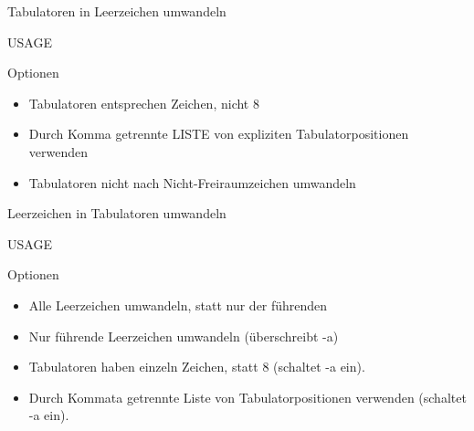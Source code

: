 \documentclass[aspectratio=43]{beamer}
\begin{document}
\begin{frame} 
	\begin{block}{} 
        Tabulatoren in Leerzeichen umwandeln
	\end{block}
	\begin{block}{USAGE} 
	\end{block}
	\begin{exampleblock}{Optionen} 
	\begin{itemize}
		\item {} Tabulatoren entsprechen  Zeichen, nicht 8
	\item {} Durch  Komma  getrennte LISTE von expliziten Tabulatorpositionen verwenden
	\item {} Tabulatoren nicht nach  Nicht-Freiraumzeichen umwandeln
	\end{itemize}
	
	\end{exampleblock}
\end{frame}

\begin{frame} 
	\begin{block}{} 
        Leerzeichen in Tabulatoren umwandeln
	\end{block}
	\begin{block}{USAGE} 
	\end{block}
	\begin{exampleblock}{Optionen} 
	\begin{itemize}
	\item {} Alle Leerzeichen umwandeln, statt nur der führenden
	\item {} Nur führende Leerzeichen umwandeln (überschreibt -a)
	\item {} Tabulatoren haben einzeln  Zeichen, statt 8 (schaltet -a ein).
	\item {} Durch Kommata getrennte Liste von Tabulatorpositionen  verwenden (schaltet -a ein).
	\end{itemize}
	
	\end{exampleblock}
\end{frame}
\end{document}

